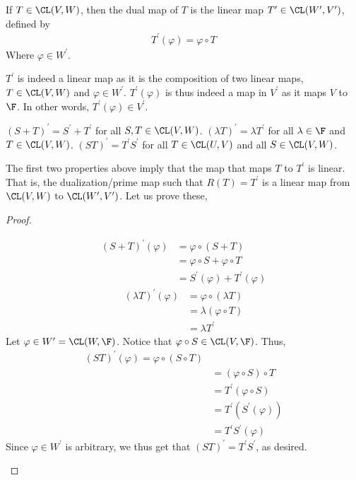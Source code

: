 \documentclass{article}
\begin{document}
  \begin{defn}
    If $T \in \CL(V, W)$, then the dual map of $T$ is the linear map $T^\prime \in \CL(W^\prime, V^\prime)$, defined by
    \begin{align*}
      T^\prime(\varphi) = \varphi \circ T
    \end{align*}
    Where $\varphi \in W^\prime$.
  \end{defn}
  $T^\prime$ is indeed a linear map as it is the composition of two linear maps, $T \in \CL(V, W)$ and $\varphi \in W^\prime$. $T^\prime(\varphi)$ is thus indeed a map in $V^\prime$ as it
  maps $V$ to $\F$. In other words, $T^\prime(\varphi) \in V^\prime$.
  \begin{prop}
    \begin{enumerate}[label=\alph*)]
      \ii 
        $(S + T)^\prime = S^\prime + T^\prime$ for all $S, T \in \CL(V, W)$.
      \ii 
        $(\lambda T)^\prime = \lambda T^\prime$ for all $\lambda \in \F$ and $T \in \CL(V, W)$.
      \ii 
        $(ST)^\prime = T^\prime S^\prime$ for all $T \in \CL(U, V)$ and all $S \in \CL(V, W)$.
    \end{enumerate}
  \end{prop}
  The first two properties above imply that the map that maps $T$ to $T^\prime$ is linear. That is, the dualization/prime map such that $R(T) = T^\prime$ is a linear map from $\CL(V, W)$ to
  $\CL(W^\prime, V^\prime)$. Let us prove these,
  \begin{proof}
    \begin{enumerate}[label=\alph*)]
      \ii 
        \begin{align*}
          (S + T)^\prime(\varphi) & = \varphi \circ (S + T) \\
          & = \varphi \circ S + \varphi \circ T \\
          & = S^\prime(\varphi) + T^\prime(\varphi)
        \end{align*}
      \ii
        \begin{align*}
          (\lambda T)^\prime(\varphi) & = \varphi \circ (\lambda T) \\
          & = \lambda(\varphi \circ T) \\
          & = \lambda T^\prime
        \end{align*}
      \ii
        Let $\varphi \in W^\prime = \CL(W, \F)$. Notice that $\varphi \circ S \in \CL(V, \F)$. Thus,
        \begin{align*}
          (ST)^\prime(\varphi) = \varphi \circ (S \circ T) \\
          & = (\varphi \circ S) \circ T \\
          & = T^\prime(\varphi \circ S) \\
          & = T^\prime(S^\prime(\varphi)) \\
          & = T^\prime S^\prime(\varphi)
        \end{align*}
        Since $\varphi \in W^\prime$ is arbitrary, we thus get that $(ST)^\prime = T^\prime S^\prime$, as desired.
    \end{enumerate}
  \end{proof}
\end{document}
